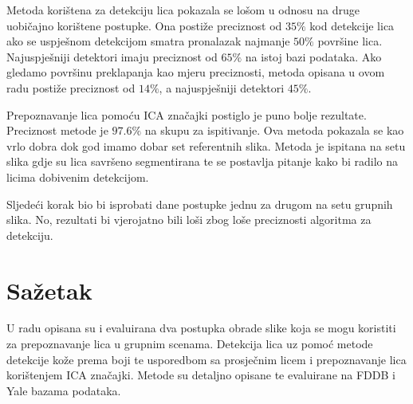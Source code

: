 \documentclass[times, utf8, seminar, numeric]{fer}
\begin{document}
Metoda korištena za detekciju lica pokazala se lošom u odnosu na druge uobičajno korištene postupke. Ona postiže preciznost od $35\%$ kod detekcije lica ako se uspješnom detekcijom smatra pronalazak najmanje $50\%$ površine lica. Najuspješniji detektori imaju preciznost od $65\%$ na istoj bazi podataka. Ako gledamo površinu preklapanja kao mjeru preciznosti, metoda opisana u ovom radu postiže preciznost od $14\%$, a najuspješniji detektori $45\%$.

Prepoznavanje lica pomoću ICA značajki postiglo je puno bolje rezultate. Preciznost metode je $97.6\%$ na skupu za ispitivanje. Ova metoda pokazala se kao vrlo dobra dok god imamo dobar set referentnih slika. Metoda je ispitana na setu slika gdje su lica savršeno segmentirana te se postavlja pitanje kako bi radilo na licima dobivenim detekcijom.

Sljedeći korak bio bi isprobati dane postupke jednu za drugom na setu grupnih slika. No, rezultati bi vjerojatno bili loši zbog loše preciznosti algoritma za detekciju.




\chapter{Sažetak}

U radu opisana su i evaluirana dva postupka obrade slike koja se mogu koristiti za prepoznavanje lica u grupnim scenama. Detekcija lica uz pomoć metode detekcije kože prema boji te usporedbom sa prosječnim licem i prepoznavanje lica korištenjem ICA značajki. Metode su detaljno opisane te evaluirane na FDDB i Yale bazama podataka.
\end{document}
